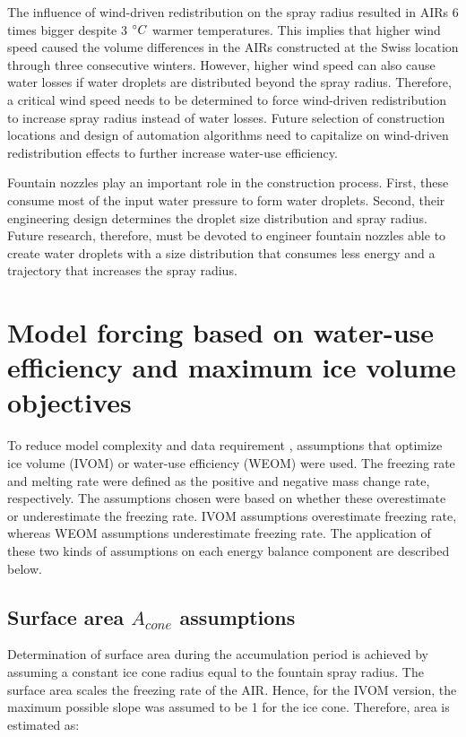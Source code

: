 \documentclass[tc, manuscript]{copernicus}
\begin{document}
The influence of wind-driven redistribution on the spray radius resulted in AIRs 6 times bigger despite 3
$^{\circ} C$ warmer temperatures. This implies that higher wind speed caused the volume differences in the AIRs
constructed at the Swiss location through three consecutive winters.  However, higher wind speed can also cause
water losses if water droplets are distributed beyond the spray radius. Therefore, a critical wind speed needs
to be determined to force wind-driven redistribution to increase spray radius instead of water losses. Future
selection of construction locations and design of automation algorithms need to capitalize on wind-driven
redistribution effects to further increase water-use efficiency.

Fountain nozzles play an important role in the construction process. First, these consume most of the input
water pressure to form water droplets. Second, their engineering design determines the droplet size distribution
and spray radius. Future research, therefore, must be devoted to engineer fountain nozzles able to create water
droplets with a size distribution that consumes less energy and a trajectory that increases the spray radius.

\appendix


\section{Model forcing based on water-use efficiency and maximum ice volume objectives} \label{sec:SEB}

To reduce model complexity and data requirement \citep{balasubramanianInfluenceMeteorologicalConditions2022},
assumptions that optimize ice volume (IVOM) or water-use efficiency (WEOM) were used. The freezing rate and
melting rate were defined as the positive and negative mass change rate, respectively. The assumptions chosen
were based on whether these overestimate or underestimate the freezing rate. IVOM assumptions overestimate
freezing rate, whereas WEOM assumptions underestimate freezing rate. The application of these two kinds of assumptions
on each energy balance component are described below. 

\subsection{Surface area $A_{cone}$ assumptions}

Determination of surface area during the accumulation period is achieved by assuming a constant ice cone
radius equal to the fountain spray radius. The surface area scales the freezing rate of the AIR. Hence, for the
IVOM version, the maximum possible slope was assumed to be 1 for the ice cone. Therefore, area is estimated as:  
\end{document}
